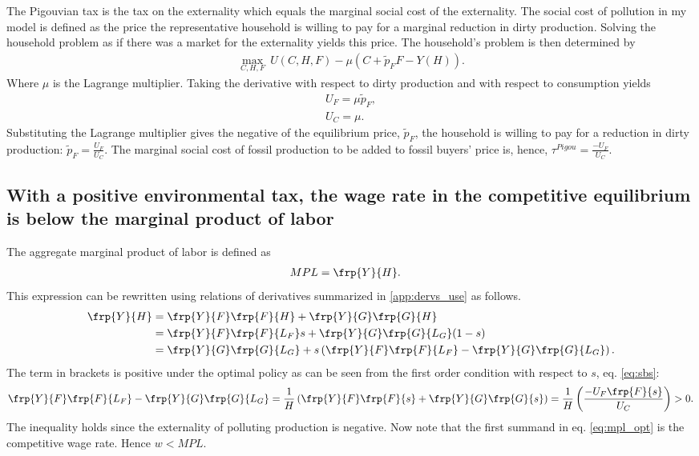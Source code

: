 The Pigouvian tax is the tax on the externality which equals the marginal social cost of the externality. 
The social cost of pollution in my model is defined as the price the representative household is willing to pay for a marginal reduction in dirty production. Solving the household problem as if there was a market for the externality yields this price. 
The household's problem is then determined by
\begin{align*}
\underset{C,H,F}{\max}\ U(C,H,F)-\mu \left(C+\tilde{p}_FF-Y(H)\right).
\end{align*}
Where $\mu$ is the Lagrange multiplier. Taking the derivative with respect to dirty production  and with respect to consumption yields
\begin{align*}
U_F=\mu \tilde{p}_F,\\
U_C=\mu.
\end{align*}
Substituting the Lagrange multiplier gives the negative of the equilibrium price, $\tilde{p}_F$, the household is willing to pay for a reduction in dirty production: $\tilde{p}_F=\frac{U_F}{U_C}$. The marginal social cost of fossil production to be added to fossil buyers' price is, hence, $\tau^{Pigou}=\frac{-U_F}{U_C}$.


\subsection{With a positive environmental tax, the wage rate in the competitive equilibrium is below the marginal product of labor}\label{app:wageMPL}
The aggregate marginal product of labor is defined as
\begin{align}
MPL&= \frp{Y}{H}.\nonumber
\end{align}
This expression can be rewritten using relations of derivatives summarized in \ref{app:dervs_use} as follows.
\begin{align}
 \frp{Y}{H}&= \frp{Y}{F}\frp{F}{H}+\frp{Y}{G}\frp{G}{H}\nonumber\\
&= \frp{Y}{F}\frp{F}{L_F}s+\frp{Y}{G}\frp{G}{L_G}(1-s)\nonumber\\
&= \frp{Y}{G}\frp{G}{L_G}+ s\left(\frp{Y}{F}\frp{F}{L_F}-\frp{Y}{G}\frp{G}{L_G}\right).\label{eq:mpl_opt}
\end{align}
The term in brackets is positive under the optimal policy as can be seen from the first order condition with respect to $s$, eq. \eqref{eq:sbs}:
\begin{align}
\frp{Y}{F}\frp{F}{L_F}-\frp{Y}{G}\frp{G}{L_G}=\frac{1}{H}\left(\frp{Y}{F}\frp{F}{s}+\frp{Y}{G}\frp{G}{s}\right)=\frac{1}{H}\left(\frac{-U_F\frp{F}{s}}{U_C}\right)>0.\label{eq:gap}
\end{align}
The inequality holds since the externality of polluting production is negative. %
Now note that the first summand in eq. \eqref{eq:mpl_opt} is the competitive wage rate.  Hence $w<MPL$.

